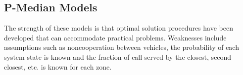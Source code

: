 \subsection{P-Median Models}
The strength of these models
is that optimal solution procedures
have been developed
that can accommodate practical problems.
Weaknesses include assumptions
such as noncooperation between vehicles,
the probability of each system state is known
and the fraction of call
served by the closest, second closest, etc.
is known for each zone.
